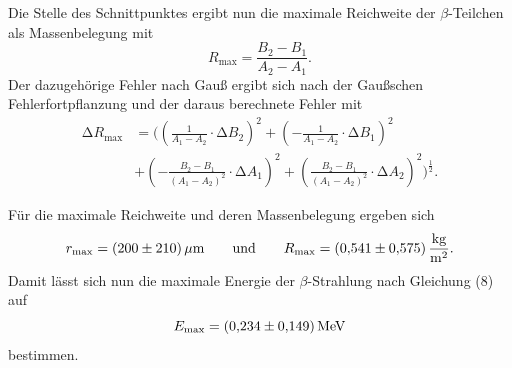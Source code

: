 Die Stelle des Schnittpunktes ergibt nun die maximale Reichweite der $\beta$-Teilchen als Massenbelegung mit
\begin{equation}
  R_\text{max} = \frac{B_2 - B_1}{A_2 -A_1}.
\end{equation}
Der dazugehörige Fehler nach Gau\ss{} ergibt sich nach der Gaußschen Fehlerfortpflanzung und der daraus berechnete Fehler mit
\begin{equation}
  \begin{split}
        \increment R_\text{max} &= \biggl(\left(\frac{1}{A_1 - A_2} \cdot \increment B_2\right)^2 + \left(-\frac{1}{A_1 - A_2} \cdot \increment B_1\right)^2 \\
         &+ \left(-\frac{B_2 - B_1}{(A_1 - A_2)^2} \cdot \increment A_1\right)^2 + \left(\frac{B_2 - B_1}{(A_1 - A_2)^2} \cdot \increment A_2\right)^2\biggr)^{\frac{1}{2}}.
  \end{split}
\end{equation}

Für die maximale Reichweite und deren Massenbelegung ergeben sich
\begin{equation}
  r_\text{max} = \SI{200 \pm 210}{\mu m}\qquad \text{und} \qquad R_\text{max} = \SI{0.541 \pm 0.575}{\frac{kg}{m^2}}.
\end{equation}
Damit lässt sich nun die maximale Energie der $\beta$-Strahlung nach Gleichung (8) auf
\begin{equation}
  E_\text{max} = \SI{0.234 \pm 0.149}{MeV}
\end{equation}
bestimmen.
